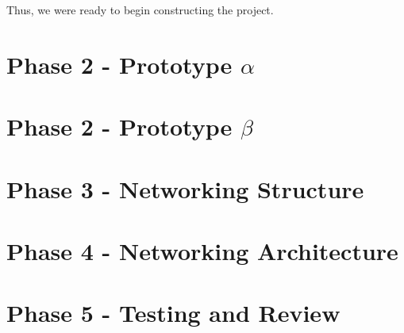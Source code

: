 Thus, we were ready to begin constructing the project.

\section{Phase 2 - Prototype $\alpha$}

\section{Phase 2 - Prototype $\beta$}

\section{Phase 3 - Networking Structure}

\section{Phase 4 - Networking Architecture}

\section{Phase 5 - Testing and Review}
